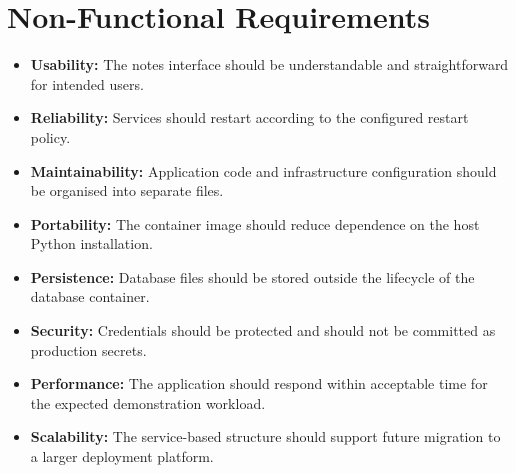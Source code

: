 \documentclass[12pt,a4paper,oneside]{report}
\begin{document}
\section{Non-Functional Requirements}
\begin{itemize}[leftmargin=0.4in]
\item \textbf{Usability:} The notes interface should be understandable and straightforward for intended users.
\item \textbf{Reliability:} Services should restart according to the configured restart policy.
\item \textbf{Maintainability:} Application code and infrastructure configuration should be organised into separate files.
\item \textbf{Portability:} The container image should reduce dependence on the host Python installation.
\item \textbf{Persistence:} Database files should be stored outside the lifecycle of the database container.
\item \textbf{Security:} Credentials should be protected and should not be committed as production secrets.
\item \textbf{Performance:} The application should respond within acceptable time for the expected demonstration workload.
\item \textbf{Scalability:} The service-based structure should support future migration to a larger deployment platform.
\end{itemize}
\end{document}
